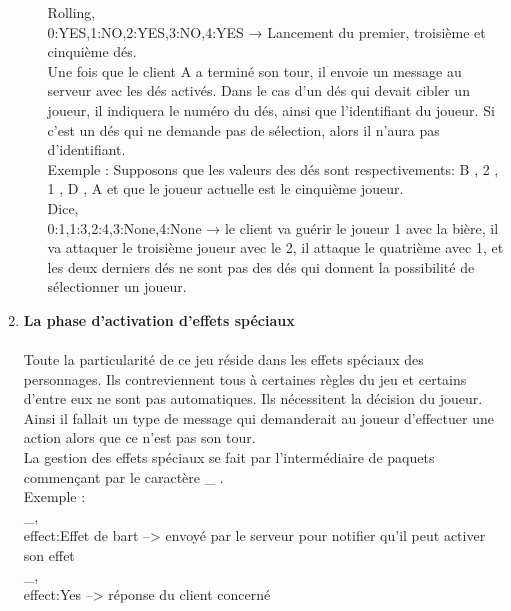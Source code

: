 \documentclass[a4paper,11pt]{article}
\begin{document}
\begin{enumerate}
\begin{enumerate}[label=(\roman*)]
Rolling, \\
0:YES,1:NO,2:YES,3:NO,4:YES → Lancement du premier, troisième et cinquième dés. \\

Une fois que le client A a terminé son tour, il envoie un message au serveur avec les dés activés. Dans le cas d’un dés qui devait cibler un joueur, il indiquera le numéro du dés, ainsi que l’identifiant du joueur. Si c’est un dés qui ne demande pas de sélection, alors il n’aura pas d’identifiant. \\

Exemple : Supposons que les valeurs des dés sont respectivements: B , 2 , 1 , D , A et que le joueur actuelle est le cinquième joueur. \\

 Dice,  \\
0:1,1:3,2:4,3:None,4:None → le client va guérir le joueur 1 avec la bière, il va attaquer le  
    troisième joueur avec le 2, il attaque le quatrième avec 1, et  
    les deux derniers dés ne sont pas des dés qui donnent la  
    possibilité de sélectionner un joueur. \\
    
\newpage

		

		\end{enumerate}
	
	\item  \textbf{La phase d’activation d'effets spéciaux} \\\\
	Toute la particularité de ce jeu réside dans les effets spéciaux des personnages. Ils contreviennent tous à certaines règles du jeu et certains d’entre eux ne sont pas automatiques. Ils nécessitent la décision du joueur. Ainsi il fallait un type de message qui demanderait au joueur d'effectuer une action alors que ce n’est pas son tour.  \\
	
La gestion des effets spéciaux se fait par l'intermédiaire de paquets commençant par le caractère \_ . \\

Exemple : \\
\_, \\
effect:Effet de bart  --> envoyé par le serveur pour notifier qu’il peut activer son effet \\

\_, \\
effect:Yes --> réponse du client concerné \\


\end{enumerate}
\end{document}
